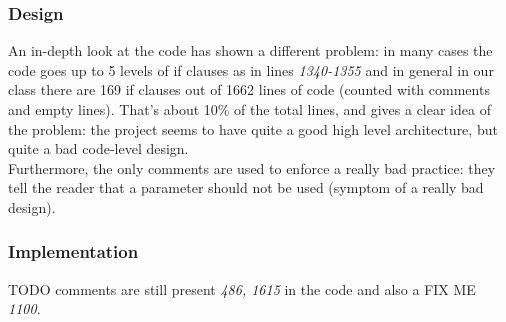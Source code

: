 \subsubsection{Design}
An in-depth look at the code has shown a different problem: in many cases the code goes up to 5 levels of if clauses as in lines \textit{1340-1355} and in general in our class there are 169 if clauses out of 1662 lines of code (counted with comments and empty lines). That's about 10\% of the total lines, and gives a clear idea of the problem: the project seems to have quite a good high level architecture, but quite a bad code-level design.\\
Furthermore, the only comments are used to enforce a really bad practice: they tell the reader that a parameter should not be used (symptom of a really bad design).

\subsubsection{Implementation}
TODO comments are still present \textit{486, 1615} in the code and also a FIX ME \textit{1100}.
